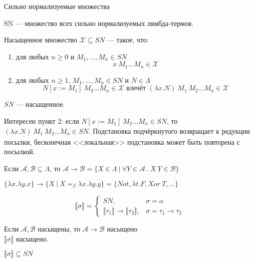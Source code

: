 \documentclass[aspectratio=169]{beamer}
\begin{document}
\begin{frame}{Сильно нормализуемые множества}
\begin{dfn}SN --- множество всех сильно нормализуемых лямбда-термов.

Насыщенное множество $\mathcal{X} \subseteq SN$ --- такое, что: \begin{enumerate}
\item для любых $n \ge 0$ и $M_1, \dots, M_n \in SN$ $$x\ M_1 \dots M_n \in \mathcal{X}$$
\item для любых $n \ge 1$, $M_1, \dots, M_n \in SN$ и $N \in \Lambda$ $$N[x := M_1]\ M_2 \dots M_n \in \mathcal{X}\text{ влечёт }(\lambda x.N)\ M_1\ M_2\dots M_n \in \mathcal{X}$$
\end{enumerate}
\end{dfn}

\vspace{-0.7cm}
\begin{lmm}
$SN$ --- насыщенное. 
\end{lmm}
Интересен пункт 2: если $N[x := M_1]\ M_2\dots M_n \in SN$, то $\underline{(\lambda x.N)\ M_1}\ M_2\dots M_n \in SN$. Подстановка подчёркнутого 
возвращает к редукции посылки, бесконечная <<локальная>> подстановка может быть повторена с посылкой.
\end{frame}

\begin{frame}{}
\begin{dfn}
Если $\mathcal{A},\mathcal{B} \subseteq \Lambda$, то $\mathcal{A} \rightarrow \mathcal{B} = \{ X \in \Lambda\ |\ \forall Y \in \mathcal{A}\ .\ X\ Y \in \mathcal{B}\}$
\end{dfn}

\begin{exm}
$\{ \lambda x.\lambda y.x \} \rightarrow \{ X\ |\ X =_\beta \lambda x.\lambda y.y \} = \{ Not, \lambda t.F, Xor\ T, \dots \}$
\end{exm}

\begin{dfn}
$$\llbracket \sigma \rrbracket = \left\{\begin{array}{ll}SN, & \sigma = \alpha\\
  \llbracket \tau_1 \rrbracket \rightarrow \llbracket \tau_2 \rrbracket, & \sigma = \tau_1 \rightarrow \tau_2\end{array}\right.$$
\end{dfn}

\begin{lmm}
Если $\mathcal{A}, \mathcal{B}$ насыщены, то $\mathcal{A}\rightarrow\mathcal{B}$ насыщено\\
$\llbracket\sigma\rrbracket$ насыщено.
\end{lmm}

\begin{lmm}$\llbracket\sigma\rrbracket\subseteq SN$\end{lmm}

\end{frame}
\end{document}
